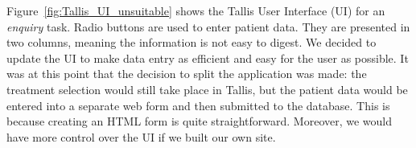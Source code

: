 \documentclass[11pt]{article}
\begin{document}

Figure~\ref{fig:Tallis_UI_unsuitable} shows the Tallis User Interface (UI) for an \textit{enquiry} task. Radio buttons are used to enter patient data. They are presented in two columns, meaning the information is not easy to digest. We decided to update the UI to make data entry as efficient and easy for the user as possible. It was at this point that the decision to split the application was made: the treatment selection would still take place in Tallis, but the patient data would be entered into a separate web form and then submitted to the database. This is because creating an HTML form is quite straightforward. Moreover, we would have more control over the UI if we built our own site.
\end{document}
